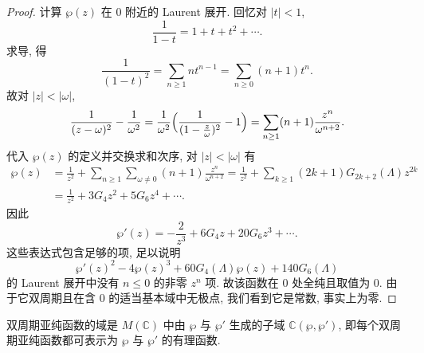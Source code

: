 \begin{proof}
计算 $\wp(z)$ 在 $0$ 附近的 Laurent 展开. 回忆对 $|t| < 1$,
\[
\frac{1}{1-t} = 1 + t + t^2 + \cdots.
\]
求导, 得
\[
\frac{1}{(1-t)^2} = \sum\limits_{n\ge 1}nt^{n-1} = \sum\limits_{n\ge 0}(n+1)t^n.
\]
故对 $|z| < |\omega|$,
\[
\frac{1}{(z-\omega)^2} - \frac{1}{\omega^2} = \frac{1}{\omega^2}\Bigl(\frac{1}{(1-\frac{z}{\omega})^2} - 1\Bigr) = \sum\limits_{n\ge 1}(n+1)\frac{z^n}{\omega^{n+2}}.
\]
代入 $\wp(z)$ 的定义并交换求和次序, 对 $|z| < |\omega|$ 有
\begin{align*}
\wp(z) &= \frac{1}{z^2} + \sum\limits_{n\ge 1}\sum\limits_{\omega\neq 0}(n+1)\frac{z^n}{\omega^{n+2}}
= \frac{1}{z^2} + \sum\limits_{k\ge 1}(2k+1)G_{2k+2}(\Lambda)z^{2k}\\
&= \frac{1}{z^2} + 3G_4z^2 + 5G_6z^4 + \cdots.
\end{align*}
因此
\[
\wp'(z) = -\frac{2}{z^3} + 6G_4z + 20G_6z^3 + \cdots.
\]
这些表达式包含足够的项, 足以说明
\[
\wp'(z)^2 - 4\wp(z)^3 + 60G_4(\Lambda)\wp(z) + 140G_6(\Lambda)
\]
的 Laurent 展开中没有 $n\le 0$ 的非零 $z^n$ 项. 故该函数在 $0$ 处全纯且取值为 $0$. 由于它双周期且在含 $0$ 的适当基本域中无极点, 我们看到它是常数, 事实上为零.
\end{proof}

\begin{proposition} \label{thm:3.2.7} 
双周期亚纯函数的域是 $M(\mathbb{C})$ 中由 $\wp$ 与 $\wp'$ 生成的子域 $\mathbb{C}(\wp, \wp')$, 即每个双周期亚纯函数都可表示为 $\wp$ 与 $\wp'$ 的有理函数.
\end{proposition}

